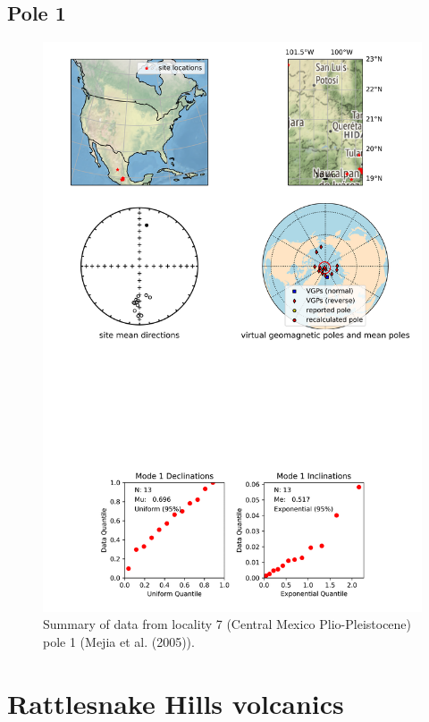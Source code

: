 \subsection{Pole 1}


\begin{figure}[H]
\centering
\includegraphics[width=5 in]{./7/1/pole_summary.png}
\caption{Summary of data from locality 7 (Central Mexico Plio-Pleistocene) pole 1 (Mejia et al. (2005)).}
\end{figure}

\section{Rattlesnake Hills volcanics}
